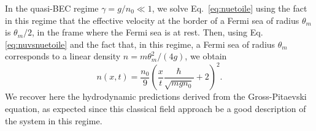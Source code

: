 \documentclass[submission, Phys]{SciPost}
\begin{document}
In the quasi-BEC regime $\gamma=g/n_0\ll 1$, we solve Eq.~\eqref{eq:nuetoile} using the fact in this regime that the effective velocity at the border of a Fermi sea of radius $\theta_m$ is 
$\theta_m/2$, in the frame where the Fermi sea is at rest. Then, using Eq.\eqref{eq:nuvsnuetoile} and the fact that, in this regime, a Fermi sea of radius $\theta_m$ corresponds to a linear density $n=m\theta_m^2/(4 g)$, we obtain
\begin{equation}
    n(x,t)= \frac{n_0}{9}\left ( \frac{x}{t}\frac{\hbar}{\sqrt{mgn_0}} +2 \right )^2  .
    \label{eq:GPE}
\end{equation}
We recover here the hydrodynamic predictions derived from the Gross-Pitaevski equation\cite{el_decay_1995,xu_dispersive_2017}, as expected since this classical field approach be a good description of the system in this regime. 



\end{document}
